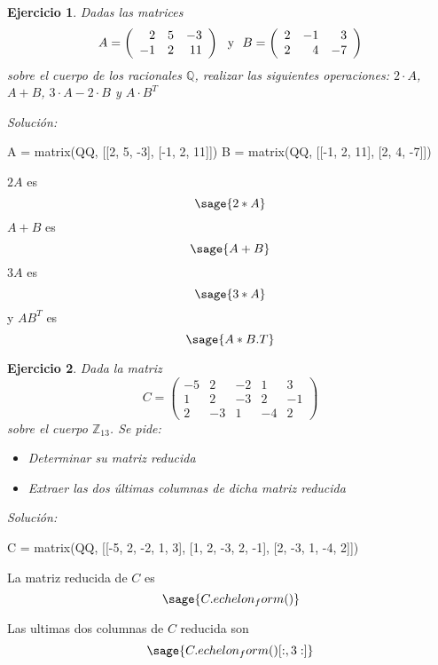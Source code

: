 \documentclass{amsart}
\newtheorem{ejer}{Ejercicio}
\def\z{\mathbb{Z}}
\def\q{\mathbb{Q}}
\begin{document}
\begin{ejer}
Dadas las matrices 
\[ A =
	\left( \begin{array}{rrr}
		2 & 5 & -3 \\
		-1 & 2 & 11
	\end{array}
	\right) \ \ \hbox{y} \ \   B =
	\left( \begin{array}{rrr}
		2 & -1 & 3 \\
		2 & 4 & -7
	\end{array}
	\right) 
	\]
sobre el cuerpo de los racionales $\q$, realizar las siguientes operaciones: $2\cdot A$, $A+B$, $3\cdot A -2\cdot B$ y $A\cdot B^T$

\end{ejer}
{\it Soluci\'on:}

\begin{sageblock}
	A = matrix(QQ, [[2, 5, -3], [-1, 2, 11]])
	B = matrix(QQ, [[-1, 2, 11], [2, 4, -7]])
\end{sageblock}

$2 A$ es $$\sage{2 * A}$$ $A + B$ es $$\sage{A + B}$$ $3 A$ es $$\sage{3 * A}$$ y $A B^T$ es $$\sage{A * B.T}$$


\begin{ejer}
Dada la matriz 
\[ C =
	\left( \begin{array}{rrrrr}
		-5 & 2 & -2  & 1 & 3 \\
		1 & 2 & -3 & 2 & -1 \\ 
		2 & -3 & 1 & -4 & 2
	\end{array}
	\right) \]
sobre el cuerpo $\z _{13}$. Se pide:
\begin{itemize}
\item Determinar su matriz reducida
\item Extraer las dos últimas columnas de dicha matriz reducida
\end{itemize}	
\end{ejer}
{\it Soluci\'on:}

\begin{sageblock}
	C = matrix(QQ, [[-5, 2, -2, 1, 3], [1, 2, -3, 2, -1], [2, -3, 1, -4, 2]])
\end{sageblock}

La matriz reducida de $C$ es $$\sage{C.echelon_form()}$$

Las ultimas dos columnas de $C$ reducida son $$\sage{C.echelon_form()[:, 3:]}$$

\end{document}
